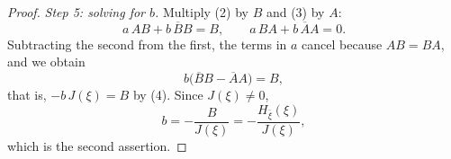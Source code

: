 \begin{proof}
\emph{Step 5: solving for $b$.}  Multiply (2) by $B$ and (3) by $A$:
\[
  a\,AB+b\,\overline{B}B=B,
  \qquad
  a\,BA+b\,\overline{A}A=0 .
\]
Subtracting the second from the first, the terms in $a$ cancel because
$AB=BA$, and we obtain
\[
  b\bigl(\overline{B}B-\overline{A}A\bigr)=B,
\]
that is, $-b\,J(\xi)=B$ by (4).  Since $J(\xi)\neq0$,
\[
  b=-\frac{B}{J(\xi)}=-\frac{H_{\bar\xi}(\xi)}{J(\xi)},
\]
which is the second assertion.
\end{proof}
